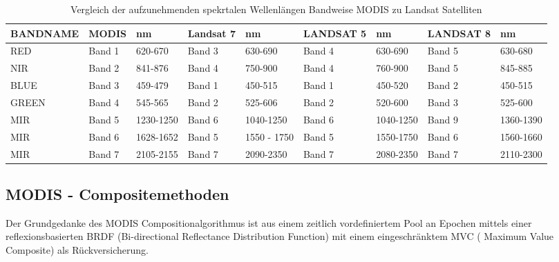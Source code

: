 \documentclass[11pt]{report}
\begin{document}
\begin{table}[!h]
\small
\hspace{-3cm}
\begin{tabular}{|l|l|l|l|l|l|l|l|l|}
\hline
BANDNAME & MODIS & nm & Landsat 7 & nm & LANDSAT 5 & nm & LANDSAT 8 & nm \\ \hline
RED   & Band 1 & 620-670   & Band 3 & 630-690     & Band 4 & 630-690   & Band 5 & 630-680 \\ \hline
NIR   & Band 2 & 841-876   & Band 4 & 750-900     & Band 4 & 760-900   & Band 5 & 845-885 \\ \hline
BLUE  & Band 3 & 459-479   & Band 1 & 450-515     & Band 1 & 450-520   & Band 2 & 450-515 \\ \hline
GREEN & Band 4 & 545-565   & Band 2 & 525-606     & Band 2 & 520-600   & Band 3 & 525-600 \\ \hline
MIR   & Band 5 & 1230-1250 & Band 6 & 1040-1250   & Band 6 & 1040-1250 & Band 9 & 1360-1390 \\ \hline
MIR   & Band 6 & 1628-1652 & Band 5 & 1550 - 1750 & Band 5 & 1550-1750 & Band 6 & 1560-1660 \\ \hline
MIR   & Band 7 & 2105-2155 & Band 7 & 2090-2350   & Band 7 & 2080-2350 & Band 7 & 2110-2300 \\ \hline
\end{tabular}
\caption{Vergleich der aufzunehmenden spekrtalen Wellenlängen Bandweise MODIS zu Landsat Satelliten}
\end{table}


\subsection{MODIS - Compositemethoden}
Der Grundgedanke des MODIS Compositionalgorithmus ist aus einem zeitlich vordefiniertem Pool an Epochen mittels einer reflexionsbasierten BRDF (Bi-directional Reflectance Distribution Function) mit einem eingeschränktem MVC ( Maximum Value Composite) als Rückversicherung.
\end{document}
